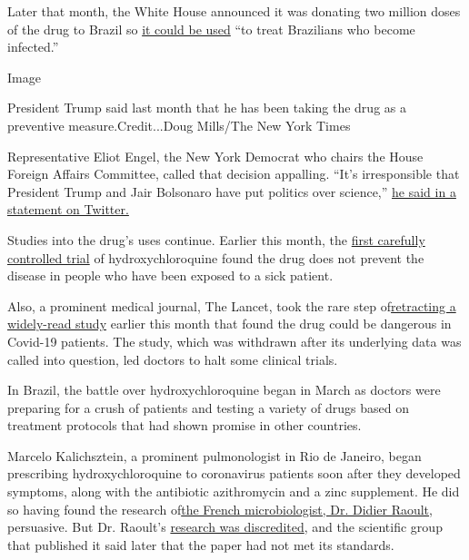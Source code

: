 Later that month, the White House announced it was donating two million
doses of the drug to Brazil so
\href{https://www.whitehouse.gov/briefings-statements/joint-statement-united-states-america-federative-republic-brazil-regarding-health-cooperation/}{it
could be used} ``to treat Brazilians who become infected.''

Image

President Trump said last month that he has been taking the drug as a
preventive measure.Credit...Doug Mills/The New York Times

Representative Eliot Engel, the New York Democrat who chairs the House
Foreign Affairs Committee, called that decision appalling. ``It's
irresponsible that President Trump and Jair Bolsonaro have put politics
over science,''
\href{https://twitter.com/HouseForeign/status/1267826331930128386?s=20}{he
said in a statement on Twitter.}

Studies into the drug's uses continue. Earlier this month, the
\href{https://www.nytimes.com/2020/06/03/health/hydroxychloroquine-coronavirus-trump.html}{first
carefully controlled trial} of hydroxychloroquine found the drug does
not prevent the disease in people who have been exposed to a sick
patient.

Also, a prominent medical journal, The Lancet, took the rare step
of\href{https://www.nytimes.com/reuters/2020/06/05/world/europe/05reuters-health-coronavirus-hydroxychloroquine-lancet.html}{retracting
a widely-read study} earlier this month that found the drug could be
dangerous in Covid-19 patients. The study, which was withdrawn after its
underlying data was called into question, led doctors to halt some
clinical trials.

In Brazil, the battle over hydroxychloroquine began in March as doctors
were preparing for a crush of patients and testing a variety of drugs
based on treatment protocols that had shown promise in other countries.

Marcelo Kalichsztein, a prominent pulmonologist in Rio de Janeiro, began
prescribing hydroxychloroquine to coronavirus patients soon after they
developed symptoms, along with the antibiotic azithromycin and a zinc
supplement. He did so having found the research
of\href{https://www.nytimes.com/2020/05/12/magazine/didier-raoult-hydroxychloroquine.html}{the
French microbiologist, Dr. Didier Raoult}, persuasive. But Dr. Raoult's
\href{https://retractionwatch.com/2020/04/06/hydroxychlorine-covid-19-study-did-not-meet-publishing-societys-expected-standard/}{research
was discredited}, and the scientific group that published it said later
that the paper had not met its standards.


